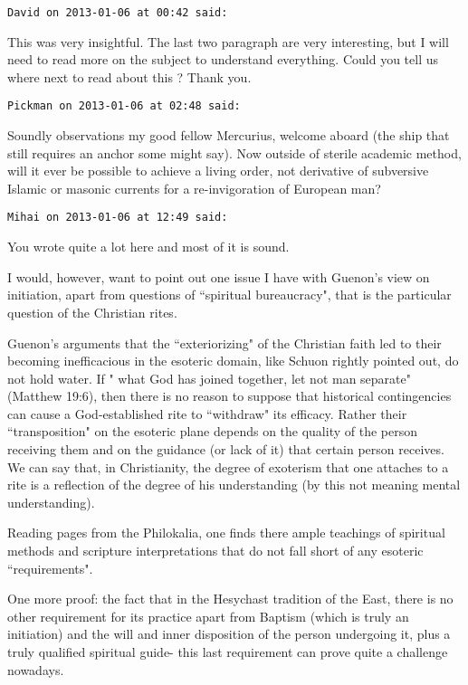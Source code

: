 \begin{footnotesize}\begin{sffamily}



\texttt{David on 2013-01-06 at 00:42 said: }

This was very insightful. The last two paragraph are very interesting, but I will need to read more on the subject to understand everything. Could you tell us where next to read about this ? Thank you.


\hfill

\texttt{Pickman on 2013-01-06 at 02:48 said: }

Soundly observations my good fellow Mercurius, welcome aboard (the ship that still requires an anchor some might say). Now outside of sterile academic method, will it ever be possible to achieve a living order, not derivative of subversive Islamic or masonic currents for a re-invigoration of European man?


\hfill

\texttt{Mihai on 2013-01-06 at 12:49 said: }

You wrote quite a lot here and most of it is sound. 

I would, however, want to point out one issue I have with Guenon's view on initiation, apart from questions of ``spiritual bureaucracy", that is the particular question of the Christian rites. 

Guenon's arguments that the ``exteriorizing" of the Christian faith led to their becoming inefficacious in the esoteric domain, like Schuon rightly pointed out, do not hold water. If " what God has joined together, let not man separate"(Matthew 19:6), then there is no reason to suppose that historical contingencies can cause a God-established rite to ``withdraw" its efficacy. Rather their ``transposition" on the esoteric plane depends on the quality of the person receiving them and on the guidance (or lack of it) that certain person receives. We can say that, in Christianity, the degree of exoterism that one attaches to a rite is a reflection of the degree of his understanding (by this not meaning mental understanding). 

Reading pages from the Philokalia, one finds there ample teachings of spiritual methods and scripture interpretations that do not fall short of any esoteric ``requirements". 

One more proof: the fact that in the Hesychast tradition of the East, there is no other requirement for its practice apart from Baptism (which is truly an initiation) and the will and inner disposition of the person undergoing it, plus a truly qualified spiritual guide- this last requirement can prove quite a challenge nowadays.


\end{sffamily}
\end{footnotesize}
